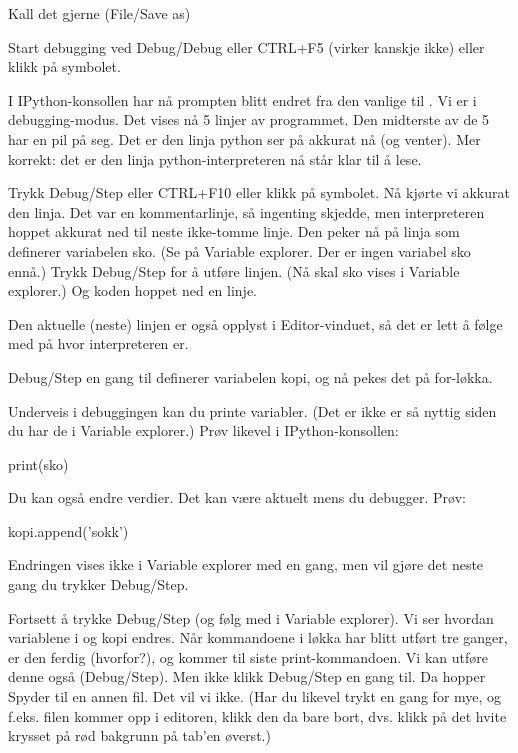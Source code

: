 Kall det gjerne  (File/Save as)

Start debugging ved Debug/Debug eller CTRL+F5 (virker kanskje ikke) eller klikk på symbolet.

I IPython-konsollen har nå prompten blitt endret fra den vanlige  til . Vi er i debugging-modus.  Det vises nå 5 linjer av programmet. Den midterste av de 5 har en pil på seg. Det er den linja python ser på akkurat nå (og venter). Mer korrekt: det er den linja python-interpreteren nå står klar til å lese.

Trykk Debug/Step eller CTRL+F10 eller klikk på symbolet. Nå kjørte vi akkurat den linja. Det var en kommentarlinje, så ingenting skjedde, men interpreteren hoppet akkurat ned til neste ikke-tomme linje. Den peker nå på linja som definerer variabelen sko. (Se på Variable explorer. Der er ingen variabel sko ennå.) Trykk Debug/Step for å utføre linjen. (Nå skal sko vises i Variable explorer.) Og koden hoppet ned en linje.

Den aktuelle (neste) linjen er også opplyst i Editor-vinduet, så det er lett å følge med på hvor interpreteren er. 

Debug/Step en gang til definerer variabelen kopi, og nå pekes det på for-løkka.

Underveis i debuggingen kan du printe variabler. (Det er ikke er så nyttig siden du har de i Variable explorer.) Prøv likevel i IPython-konsollen:
\begin{usncodebox}
print(sko)
\end{usncodebox}

Du kan også endre verdier. Det kan være aktuelt mens du debugger. Prøv:
\begin{usncodebox}
kopi.append('sokk')
\end{usncodebox}

Endringen vises ikke i Variable explorer med en gang, men vil gjøre det neste gang du trykker Debug/Step. 

Fortsett å trykke Debug/Step (og følg med i Variable explorer). Vi ser hvordan variablene i og kopi endres. Når kommandoene i løkka har blitt utført tre ganger, er den ferdig (hvorfor?), og kommer til siste print-kommandoen. Vi kan utføre denne også (Debug/Step). Men ikke klikk Debug/Step en gang til. Da hopper Spyder til en annen fil. Det vil vi ikke. (Har du likevel trykt en gang for mye, og f.eks. filen  kommer opp i editoren, klikk den da bare bort, dvs. klikk på det hvite krysset på rød bakgrunn på tab'en øverst.)

